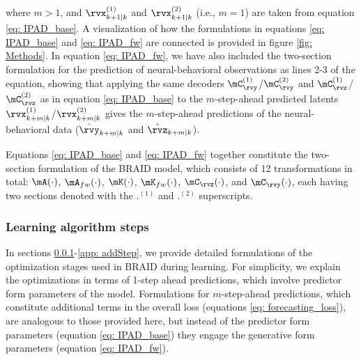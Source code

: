 \documentclass{article} %
\newcommand{\ourmethod}{BRAID}
\begin{document}
where $m>1$, and \(\rvx^{(1)}_{k+1|k}\) and \(\rvx^{(2)}_{k+1|k}\) (i.e., $m\!=\!1$) are taken from equation \ref{eq: IPAD_base}. A visualization of how the formulations in equations \ref{eq: IPAD_base} and \ref{eq: IPAD_fw} are connected is provided in figure \ref{fig: Methods}.
In equation \ref{eq: IPAD_fw}, we have also included the two-section formulation for the prediction of neural-behavioral observations as lines 2-3 of the equation, showing that applying the same decoders \(\mC^{(1)}_{\rvy}\)/\(\mC^{(2)}_{\rvy}\) and \(\mC^{(1)}_{\rvz}\)/\(\mC^{(2)}_{\rvz}\) as in equation \ref{eq: IPAD_base} to the $m$-step-ahead predicted latents \(\rvx^{(1)}_{k+m|k}\)/\(\rvx^{(2)}_{k+m|k}\) gives the $m$-step-ahead predictions of the neural-behavioral data (\(\hat{\rvy}_{k+m|k}\) and \(\hat{\rvz}_{k+m|k}\)). 

Equations \ref{eq: IPAD_base} and \ref{eq: IPAD_fw} together constitute the two-section formulation of the \ourmethod{} model, which consists of 12 transformations in total: \(\mA(\cdot)\), \(\mA_{fw}(\cdot)\), \(\mK(\cdot)\), \(\mK_{fw}(\cdot)\), \(\mC_{\rvz}(\cdot)\), and \(\mC_{\rvy}(\cdot)\), each having two sections denoted with the \(.^{(1)}\) and \(.^{(2)}\) superscripts. %



\subsubsection{Learning algorithm steps}\label{app: LearnigAlgo}

In sections \ref{app: LearnigAlgo}-\ref{app: addStep}, we provide detailed formulations of the optimization stages used in \ourmethod{} during learning. For simplicity, we explain the optimizations in terms of 1-step ahead predictions, which involve predictor form parameters of the model. Formulations for \(m\)-step-ahead predictions, which constitute additional terms in the overall loss (equations \ref{eq: forecasting_loss}), are analogous to those provided here, but instead of the predictor form parameters (equation \ref{eq: IPAD_base}) they engage the generative form parameters (equation \ref{eq: IPAD_fw}). 
\end{document}
